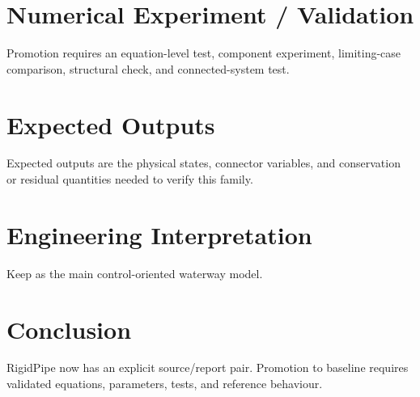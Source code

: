 \documentclass[10pt,a4paper]{article}
\begin{document}
\section{Numerical Experiment / Validation}Promotion requires an equation-level test, component experiment, limiting-case comparison, structural check, and connected-system test.
\section{Expected Outputs}Expected outputs are the physical states, connector variables, and conservation or residual quantities needed to verify this family.
\section{Engineering Interpretation}Keep as the main control-oriented waterway model.
\section*{Conclusion}RigidPipe now has an explicit source/report pair. Promotion to baseline requires validated equations, parameters, tests, and reference behaviour.
\end{document}
